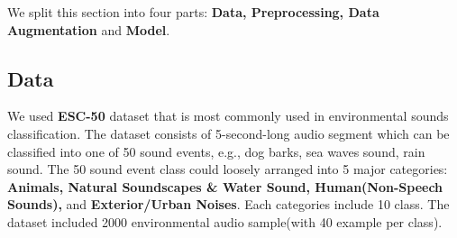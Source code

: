 We split this section into four parts: \textbf{Data, Preprocessing, Data Augmentation} and \textbf{Model}.
\subsection{Data}
We used \textbf{ESC-50} dataset that is most commonly used in environmental sounds classification. The dataset consists of 5-second-long audio segment which can be classified into one of 50 sound events, e.g., dog barks, sea waves sound, rain sound.
The 50 sound event class could loosely arranged into 5 major categories: \textbf{Animals, Natural Soundscapes \& Water Sound, Human(Non-Speech Sounds), }and \textbf{Exterior/Urban Noises}. Each categories include 10 class.
The dataset included 2000 environmental audio sample(with 40 example per class).


